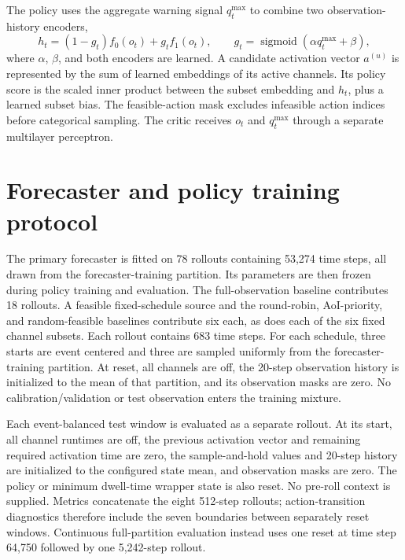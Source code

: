 \documentclass[preprint,12pt]{elsarticle}
\begin{document}
The policy uses the aggregate warning signal \(q_t^{\max}\) to combine two observation-history
encoders,
\begin{equation}
  h_t=(1-g_t)f_0(o_t)+g_t f_1(o_t),\qquad
  g_t=\operatorname{sigmoid}(\alpha q_t^{\max}+\beta),
\end{equation}
where \(\alpha\), \(\beta\), and both encoders are learned. A candidate
activation vector \(a^{(u)}\) is represented by the sum of learned embeddings of
its active channels. Its policy score is the scaled inner product between the
subset embedding and \(h_t\), plus a learned subset bias. The
feasible-action mask excludes infeasible action indices before categorical sampling. The critic receives \(o_t\) and
\(q_t^{\max}\) through a separate multilayer perceptron.

\section{Forecaster and policy training protocol}

The primary forecaster is fitted on 78 rollouts containing 53,274 time steps,
all drawn from the forecaster-training partition. Its parameters are then frozen
during policy training and evaluation. The full-observation baseline contributes
18 rollouts. A feasible fixed-schedule source and the round-robin, AoI-priority,
and random-feasible baselines contribute six each, as does each of the six fixed
channel subsets. Each rollout contains 683 time steps. For each schedule, three
starts are event centered and three are sampled uniformly from the
forecaster-training partition. At reset, all channels are off, the 20-step
observation history is initialized to the
mean of that partition, and its observation masks are zero. No
calibration/validation or test observation enters the training mixture.



Each event-balanced test window is evaluated as a separate rollout. At its
start, all channel runtimes are off, the previous activation vector and
remaining required activation time are zero, the sample-and-hold values and 20-step history are
initialized to the configured state mean, and observation masks are zero. The
policy or minimum dwell-time wrapper state is also reset.
No pre-roll context is supplied. Metrics concatenate the eight 512-step
rollouts; action-transition diagnostics therefore include the seven boundaries
between separately reset windows. Continuous full-partition evaluation instead
uses one reset at time step 64,750 followed by one 5,242-step rollout.
\end{document}
